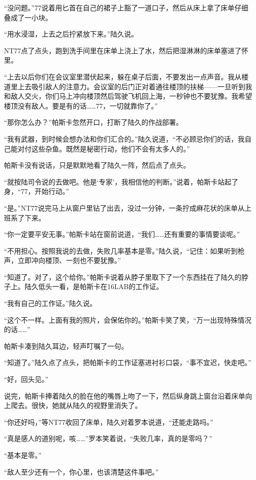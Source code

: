 “没问题。”77说着用匕首在自己的裙子上豁了一道口子，然后从床上拿了床单仔细叠成了一小块。

“用水浸湿，上去之后拧紧放下来。”陆久说。

NT77点了点头，跑到洗手间里在床单上浇上了水，然后把湿淋淋的床单塞进了怀里。

“上去以后你们在会议室里潜伏起来，躲在桌子后面，不要发出一点声音。我从楼道里上去吸引敌人的注意力。会议室的后门正对着通往楼顶的扶梯——一旦听到我和敌人交火，你们马上冲向楼顶然后驾驶飞机回上海，一秒钟也不要犹豫。我希望楼顶没有敌人。要是有的话……77，一切就靠你了。”

“那你怎么办？”帕斯卡忽然开口，打断了陆久的作战部署。

“我有武器，到时候会想办法和你们汇合的。”陆久说道，“不必顾忌你们的话，我自己能对付这些杂鱼。既然是秘密行动，他们不会有太多人的。”

帕斯卡没有说话，只是默默地看了陆久一阵，然后点了点头。

“就按陆司令说的去做吧。他是‘专家’，我相信他的判断。”说着，帕斯卡站起了身，“77，开始行动。”

“是。”NT77说完马上从窗户里钻了出去，没过一分钟，一条拧成麻花状的床单从上班系了下来。

“你一定要平安无事。”帕斯卡站在窗前说道，“我们……还有重要的事情要谈呢。”

“不用担心。按照我说的去做，失败几率基本是零。”陆久说，“记住：如果听到枪声，立即冲向楼顶、一刻也不要犹豫。”

“知道了。对了，这个给你。”帕斯卡说着从脖子里取下了一个东西挂在了陆久的脖子上。陆久低头一看，是帕斯卡在16LAB的工作证。

“我有自己的工作证。”陆久说。

“这个不一样。上面有我的照片，会保佑你的。”帕斯卡笑了笑，“万一出现特殊情况的话……”

帕斯卡凑到陆久耳边，轻声叮嘱了一句。

“知道了。”陆久点了点头，把帕斯卡的工作证塞进衬衫口袋，“事不宜迟，快走吧。”

“好，回头见。”

说完，帕斯卡捧着陆久的脸在他的嘴唇上吻了一下，然后纵身跳上窗台沿着床单向上爬去。很快，她就从陆久的视野里消失了。

“你还好吗，”等NT77收回了床单，陆久对着罗本说道，“还能走路吗。”

“真是感人的道别呢，咳……”罗本笑着说，“失败几率，真的是零吗？”

“基本是零。”

“敌人至少还有一个，你心里，也该清楚这件事吧。”

